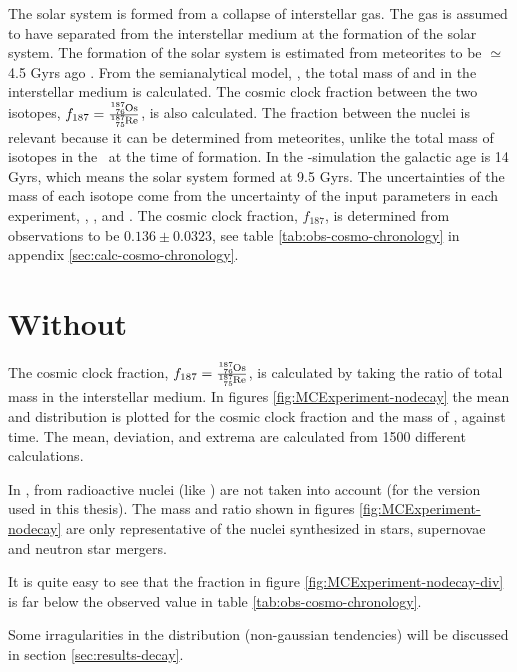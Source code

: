 The solar system is formed from a collapse of interstellar gas.
The gas is assumed to have separated from the interstellar medium at the formation of the solar system.
The formation of the solar system is estimated from meteorites to be $\simeq$ 4.5 Gyrs ago .
From the semianalytical model, \omegamodel, the total mass of  and  in the interstellar medium is calculated.
The cosmic clock fraction between the two isotopes, $f_{187} = \frac{\os{187}}{\re{187}}$, is also calculated.
The fraction between the nuclei is relevant because it can be determined from meteorites, unlike the total mass of isotopes in the \sos\ at the time of formation.
In the \eris-simulation the galactic age is 14 Gyrs, which means the solar system formed at 9.5 Gyrs.
The uncertainties of the mass of each isotope come from the uncertainty of the input parameters in each experiment, \expone, \exptwo, and \expthree.
The cosmic clock fraction, $f_{187}$, is determined from observations to be $0.136\pm0.0323$, see table \ref{tab:obs-cosmo-chronology} in appendix \ref{sec:calc-cosmo-chronology}.


\section{Without \betadecay}
\label{sec:results-nodecay}
\setlength{\subfigwidth}{0.40\textwidth}
\setlength{\figwidth}{0.6\textwidth}
The cosmic clock fraction, $f_{187} = \frac{\os{187}}{\re{187}}$, is calculated by taking the ratio of total mass in the interstellar medium.
In figures \ref{fig:MCExperiment-nodecay} the mean and distribution is plotted for the cosmic clock fraction and the mass of ,  against time.
The mean, deviation, and extrema are calculated from 1500 different calculations.

In \omegamodel, \betadecay from radioactive nuclei (like ) are not taken into account (for the version used in this thesis).
The mass and ratio shown in figures \ref{fig:MCExperiment-nodecay} are only representative of the nuclei synthesized in stars, supernovae and neutron star mergers.

It is quite easy to see that the fraction in figure \ref{fig:MCExperiment-nodecay-div} is far below the observed value in table \ref{tab:obs-cosmo-chronology}.

Some irragularities in the distribution (non-gaussian tendencies) will be discussed in section \ref{sec:results-decay}.

